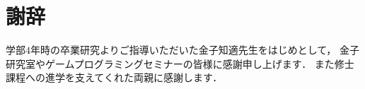 \chapter*{謝辞}
学部$4$年時の卒業研究よりご指導いただいた金子知適先生をはじめとして， 金子研究室やゲームプログラミングセミナーの皆様に感謝申し上げます．
また修士課程への進学を支えてくれた両親に感謝します．